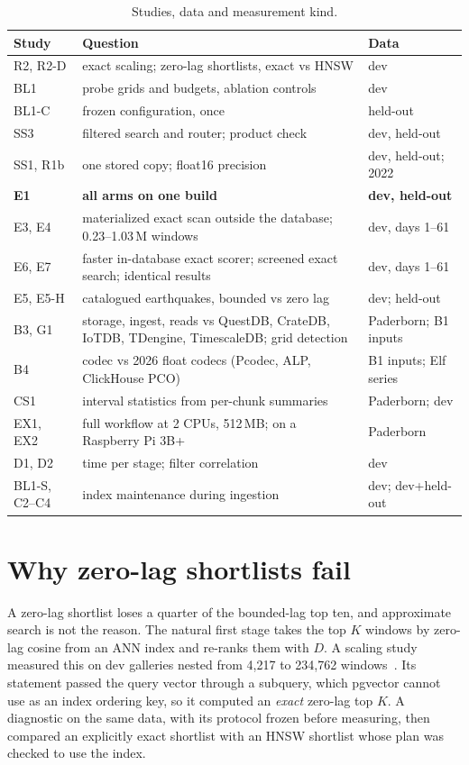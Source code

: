 \documentclass[sigconf]{acmart}
\begin{document}
\begin{table}[t]
\caption{Studies, data and measurement kind.}
\label{tab:studies}
\small
\begin{tabularx}{\linewidth}{@{}lXl@{}}
\toprule
Study & Question & Data \\
\midrule
R2, R2-D & exact scaling; zero-lag shortlists, exact vs HNSW & dev \\
BL1 & probe grids and budgets, ablation controls & dev \\
BL1-C & frozen configuration, once & held-out \\
SS3 & filtered search and router; product check & dev, held-out \\
SS1, R1b & one stored copy; float16 precision & dev, held-out; 2022 \\
\textbf{E1} & \textbf{all arms on one build} & \textbf{dev, held-out} \\
E3, E4 & materialized exact scan outside the database; 0.23--1.03\,M windows & dev, days 1--61 \\
E6, E7 & faster in-database exact scorer; screened exact search; identical results & dev, days 1--61 \\
E5, E5-H & catalogued earthquakes, bounded vs zero lag & dev; held-out \\
B3, G1 & storage, ingest, reads vs QuestDB, CrateDB, IoTDB, TDengine, TimescaleDB; grid detection & Paderborn; B1 inputs \\
B4 & codec vs 2026 float codecs (Pcodec, ALP, ClickHouse PCO) & B1 inputs; Elf series \\
CS1 & interval statistics from per-chunk summaries & Paderborn; dev \\
EX1, EX2 & full workflow at 2 CPUs, 512\,MB; on a Raspberry Pi 3B+ & Paderborn \\
D1, D2 & time per stage; filter correlation & dev \\
BL1-S, C2--C4 & index maintenance during ingestion & dev; dev+held-out \\
\bottomrule
\end{tabularx}
\end{table}

\section{Why zero-lag shortlists fail}\label{sec:zerolag}
A zero-lag shortlist loses a quarter of the bounded-lag top ten, and approximate search is not the reason. The natural first stage takes the top $K$ windows by zero-lag cosine from an ANN index and re-ranks them with $D$. A scaling study measured this on dev galleries nested from 4,217 to 234,762 windows~\cite{r2}. Its statement passed the query vector through a subquery, which pgvector cannot use as an index ordering key, so it computed an \emph{exact} zero-lag top $K$. A diagnostic on the same data, with its protocol frozen before measuring, then compared an explicitly exact shortlist with an HNSW shortlist whose plan was checked to use the index.
\end{document}
